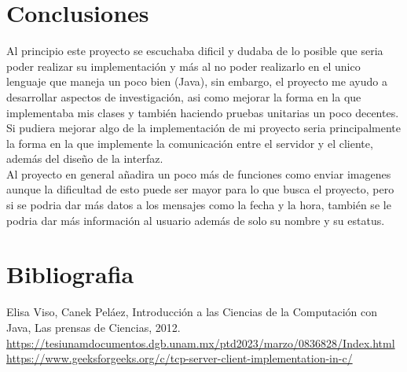 \documentclass[12pt]{report}
\begin{document}
\chapter{Conclusiones}
Al principio este proyecto se escuchaba dificil y dudaba de lo posible que seria poder realizar su implementación y más al no poder realizarlo en el unico lenguaje que maneja un poco bien (Java), sin embargo, el proyecto me ayudo a desarrollar aspectos de investigación, asi como mejorar la forma en la que implementaba mis clases y también haciendo pruebas unitarias un poco decentes.\\

Si pudiera mejorar algo de la implementación de mi proyecto seria principalmente la forma en la que implemente la comunicación entre el servidor y el cliente, además del diseño de la interfaz.\\

Al proyecto en general añadira un poco más de funciones como enviar imagenes aunque la dificultad de esto puede ser mayor para lo que busca el proyecto, pero si se podria dar más datos a los mensajes como la fecha y la hora, también se le podria dar más información al usuario además de solo su nombre y su estatus.\\

\chapter{Bibliografia}

Elisa Viso, Canek Peláez, Introducción a las Ciencias de la Computación con Java, Las prensas de Ciencias, 2012.\\

\url{https://tesiunamdocumentos.dgb.unam.mx/ptd2023/marzo/0836828/Index.html}\\

\url{https://www.geeksforgeeks.org/c/tcp-server-client-implementation-in-c/}\\
\end{document}
